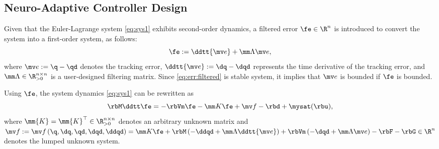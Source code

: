 \documentclass[letterpaper, journal]{IEEEtran}
\begin{document}
\subsection{Neuro-Adaptive Controller Design}\label{sec:sub:NAC}

Given that the Euler-Lagrange system \eqref{eq:sys1} exhibits second-order dynamics, a filtered error $\fe\in\R^n$ is introduced to convert the system into a first-order system, as follows:
\begin{equation}
    \fe := \ddtt{\mv e}+\mm\Lambda \mv e
    ,
    \label{eq:err:filtered}
\end{equation}
where $\mv e := \q - \qd$ denotes the tracking error, $\ddtt{\mv e} := \dq - \dqd$ represents the time derivative of the tracking error, and $\mm\Lambda\in\R^{n\times n}_{>0}$ is a user-designed filtering matrix.
Since \eqref{eq:err:filtered} is stable system, it implies that $\mv e$ is bounded if $\fe$ is bounded.

Using $\fe$, the system dynamics \eqref{eq:sys1} can be rewritten as
\begin{equation}
    \rbM \ddtt\fe
    =
    -\rbVm \fe
    -\mm K \fe
    + \mv f
    -\rbd + \mysat(\rbu)
    ,
    \label{eq:sys:filtered}
\end{equation}
where $\mm{K}=\mm{K}^\top\in\R^{n\times n}_{>0}$ denotes an arbitrary unknown matrix and $
    \mv f:= \mv f
    \left(
        \q,\dq,\qd,\dqd,\ddqd
    \right)
    =
    \mm K \fe
    +\rbM
    \left(
        -\ddqd+\mm\Lambda\ddtt{\mv e}
    \right)
    +
    \rbVm
    \left(
        -\dqd+\mm\Lambda\mv e
    \right)
    -
    \rbF
    -
    \rbG
    \in\R^n
$ denotes the lumped unknown system.
\end{document}
